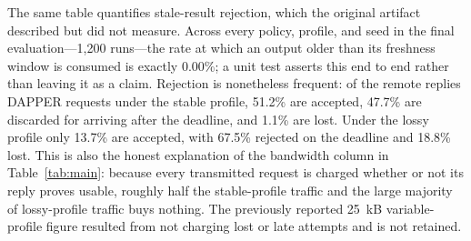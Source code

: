\documentclass[conference,a4paper]{IEEEtran}
\begin{document}
The same table quantifies stale-result rejection, which the original artifact described but did not measure. Across every policy, profile, and seed in the final evaluation---1,200 runs---the rate at which an output older than its freshness window is consumed is exactly 0.00\%; a unit test asserts this end to end rather than leaving it as a claim. Rejection is nonetheless frequent: of the remote replies DAPPER requests under the stable profile, 51.2\% are accepted, 47.7\% are discarded for arriving after the deadline, and 1.1\% are lost. Under the lossy profile only 13.7\% are accepted, with 67.5\% rejected on the deadline and 18.8\% lost. This is also the honest explanation of the bandwidth column in Table~\ref{tab:main}: because every transmitted request is charged whether or not its reply proves usable, roughly half the stable-profile traffic and the large majority of lossy-profile traffic buys nothing. The previously reported 25~kB variable-profile figure resulted from not charging lost or late attempts and is not retained.
\end{document}
